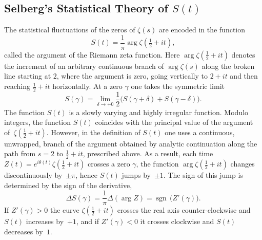 \documentclass[12pt,reqno]{amsart}
\theoremstyle{plain}
\theoremstyle{definition}
\theoremstyle{remark}
\begin{document}
\subsection{Selberg’s Statistical Theory of $S(t)$} 
\label{ss:9.2} The statistical fluctuations of the zeros of $\zeta(s)$ are encoded in the function
\begin{equation}
S(t)=\frac{1}{\pi}\arg\zeta\!\left(\tfrac{1}{2}+it\right),
\end{equation}
called the argument of the Riemann zeta function. Here $\arg\zeta(\tfrac{1}{2}+it)$ denotes the increment of an arbitrary continuous branch of $\arg\zeta(s)$ along the broken line starting at $2$, where the argument is zero, going vertically to $2+it$ and then reaching $\tfrac{1}{2}+it$ horizontally. At a zero $\gamma$ one takes the symmetric limit
\begin{equation}
S(\gamma)
=\lim_{\delta\to+0}\frac{1}{2}\bigl(S(\gamma+\delta)+S(\gamma-\delta)\bigr).
\end{equation}
The function $S(t)$ is a slowly varying and highly irregular function. Modulo integers, the function $S(t)$ coincides with the principal value of the argument of~$\zeta(\tfrac12+it)$.  However, in the definition of $S(t)$ one uses a continuous, unwrapped, branch of the argument obtained by analytic continuation along the path from $s=2$ to $\tfrac12+it$, prescribed above. As a result, each time $Z(t)=e^{i\theta(t)}\zeta(\tfrac12+it)$ crosses a zero $\gamma$, the function $\arg\zeta(\tfrac12+it)$ changes discontinuously by~$\pm\pi$, hence $S(t)$ jumps by~$\pm1$.  
The sign of this jump is determined by the sign of the derivative,
\begin{equation}
\Delta S \left (\gamma \right )
=\frac{1}{\pi}\Delta(\arg Z)
=\operatorname{sgn}\,\bigl(Z'\left (\gamma \right )\bigr).
\end{equation}
If $Z'(\gamma)>0$ the curve $\zeta(\tfrac12+it)$ crosses the real axis counter-clockwise and $S(t)$ increases by~$+1$, and if $Z'(\gamma)<0$ it crosses clockwise and $S(t)$ decreases by~$1$.
\end{document}
